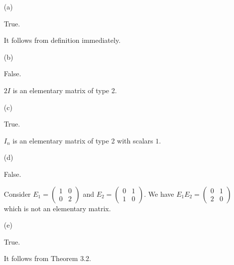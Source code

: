 \begin{Exercise}
\begin{enumerate}[(a)]
\item[(a)]
\begin{answer}
True.
\end{answer}
\begin{solution}
It follows from definition immediately.
\end{solution}

\item[(b)]
\begin{answer}
False.
\end{answer}
\begin{solution}
$2I$ is an elementary matrix of type 2.
\end{solution}

\item[(c)]
\begin{answer}
True.
\end{answer}
\begin{solution}
$I_n$ is an elementary matrix of type 2 with scalars $1$.
\end{solution}

\item[(d)]
\begin{answer}
False.
\end{answer}
\begin{solution}
Consider $E_1 = \begin{pmatrix}
1 & 0 \\
0 & 2
\end{pmatrix}$ and $E_2 = \begin{pmatrix}
0 & 1 \\
1 & 0
\end{pmatrix}$. We have $E_1 E_2 = \begin{pmatrix}
0 & 1 \\
2 & 0
\end{pmatrix}$ which is not an elementary matrix.
\end{solution}

\item[(e)]
\begin{answer}
True.
\end{answer}
\begin{solution}
It follows from Theorem 3.2.
\end{solution}


\end{enumerate}
\end{Exercise}
